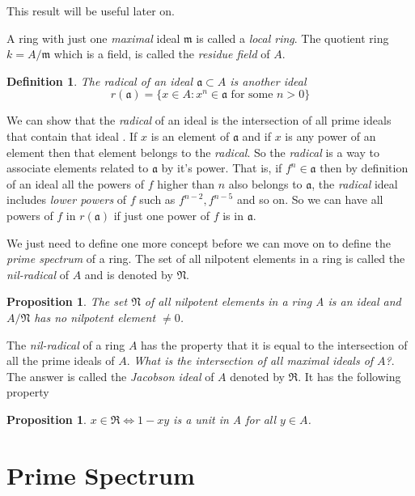 \documentclass[]{report}
\newtheorem{prop}[theorem]{Proposition}
\newtheorem{defn}[theorem]{Definition}
\begin{document}
This result will be useful later on.

A ring with just one \textit{maximal} ideal $\mathfrak{m}$ is called a \textit{local ring}. The quotient ring $k = A/\mathfrak{m}$ which is a field, is called the \textit{residue field} of $A$. 

\begin{defn}
    The radical of an ideal $\mathfrak{a}\subset A$ is another ideal 
    $$r(\mathfrak{a}) = \{x\in A: x^n\in \mathfrak{a} \text{ for some } n>0\}$$
\end{defn}

We can show that the \textit{radical} of an ideal is the intersection of all prime ideals that contain that ideal \cite{atiyah1}. If $x$ is an element of $\mathfrak{a}$ and if $x$ is any power of an element then that element belongs to the \textit{radical}. So the \textit{radical} is a way to associate elements related to $\mathfrak{a}$ by it's power. That is, if $f^n\in \mathfrak{a}$ then by definition of an ideal all the powers of $f$ higher than $n$ also belongs to $\mathfrak{a}$, the \textit{radical} ideal includes \textit{lower powers} of $f$ such as $f^{n-2}, f^{n-5}$ and so on. So we can have all powers of $f$ in $r(\mathfrak{a})$ if just one power of $f$ is in $\mathfrak{a}$. 

We just need to define one more concept before we can move on to define the \textit{prime spectrum} of a ring. The set of all nilpotent elements in a ring is called the \textit{nil-radical} of $A$ and is denoted by $\mathfrak{N}$.

\begin{prop}
    The set $\mathfrak{N}$ of all nilpotent elements in a ring A is an ideal and $A/\mathfrak{N}$ has no nilpotent element $\neq 0$. \cite{atiyah1}
\end{prop}

The \textit{nil-radical} of a ring $A$ has the property that it is equal to the intersection of all the prime ideals of $A$. \textit{What is the intersection of all maximal ideals of $A$?}. The answer is called the \textit{Jacobson ideal} of $A$ denoted by $\mathfrak{R}$. It has the following property

\begin{prop}
    $x\in \mathfrak{R} \Leftrightarrow 1-xy$ is a unit in A for all $y\in A$. \cite{atiyah1}
\end{prop}

\section{Prime Spectrum}
\end{document}
